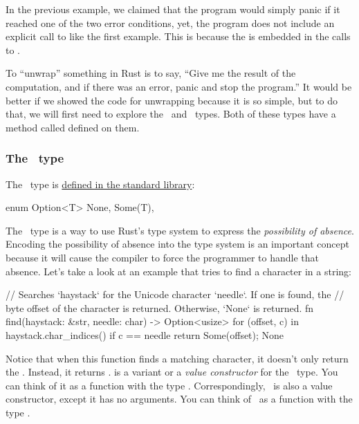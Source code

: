 In the previous example, we claimed that the program would simply panic if it reached one of the two error conditions, 
yet, the program does not include an explicit call to  like the first example. This is because the  
is embedded in the calls to .

\blank

To \enquote{unwrap} something in Rust is to say, \enquote{Give me the result of the computation, and if there was an error, 
panic and stop the program.} It would be better if we showed the code for unwrapping because it is so simple, but to do that, 
we will first need to explore the \option\ and \result\ types. Both of these types have a method called  
defined on them.

\subsubsection*{The \option\ type}

The \option\ type is \href{https://doc.rust-lang.org/std/option/enum.Option.html}{defined in the standard library}:

\begin{rustc}
enum Option<T> {
    None,
    Some(T),
}
\end{rustc}

The \option\ type is a way to use Rust's type system to express the \emph{possibility of absence}. Encoding the 
possibility of absence into the type system is an important concept because it will cause the compiler to force the 
programmer to handle that absence. Let's take a look at an example that tries to find a character in a string:

\begin{rustc}
// Searches `haystack` for the Unicode character `needle`. If one is found, the
// byte offset of the character is returned. Otherwise, `None` is returned.
fn find(haystack: &str, needle: char) -> Option<usize> {
    for (offset, c) in haystack.char_indices() {
        if c == needle {
            return Some(offset);
        }
    }
    None
}
\end{rustc}

Notice that when this function finds a matching character, it doesn't only return the . Instead, it returns 
.  is a variant or a \emph{value constructor} for the \option\ type. You can think of 
it as a function with the type . Correspondingly, \none\ is also a value constructor, 
except it has no arguments. You can think of \none\ as a function with the type .

